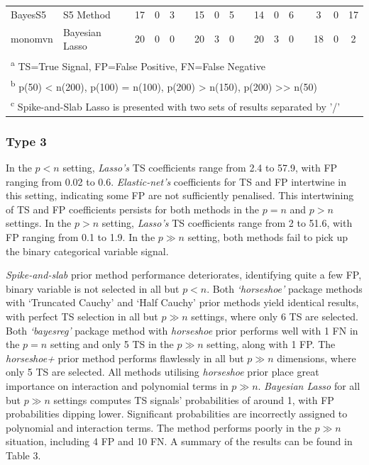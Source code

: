 \documentclass[
  11pt,
]{article}
\begin{document}
\begin{landscape}
\begin{table}[H]
\begin{tabular}[t]{>{}l|>{}l|>{}c|>{}c|>{}c|>{}c|>{}c|>{}c|>{}c|>{}c|>{}c|>{}c|>{}c|>{}c|>{}c|>{}c|>{}c|}
\hspace{1em}BayesS5 & S5 Method & 17 & 0 & 3 &  & 15 & 0 & 5 &  & 14 & 0 & 6 &  & 3 & 0 & 17\\
\hspace{1em}monomvn & Bayesian Lasso & 20 & 0 & 0 &  & 20 & 3 & 0 &  & 20 & 3 & 0 &  & 18 & 0 & 2\\
\bottomrule
\multicolumn{17}{l}{\textsuperscript{a} TS=True Signal, FP=False Positive, FN=False Negative}\\
\multicolumn{17}{l}{\textsuperscript{b} p(50) < n(200), p(100) = n(100), p(200) > n(150), p(200) >> n(50)}\\
\multicolumn{17}{l}{\textsuperscript{c} Spike-and-Slab Lasso is presented with two sets of results separated by '/'}\\
\end{tabular}
\end{table}
  
\end{landscape}

\subsubsection{Type 3}

In the \(p<n\) setting, \emph{Lasso's} TS coefficients range from 2.4 to
57.9, with FP ranging from 0.02 to 0.6. \emph{Elastic-net's}
coefficients for TS and FP intertwine in this setting, indicating some
FP are not sufficiently penalised. This intertwining of TS and FP
coefficients persists for both methods in the \(p=n\) and \(p>n\)
settings. In the \(p>n\) setting, \emph{Lasso's} TS coefficients range
from 2 to 51.6, with FP ranging from 0.1 to 1.9. In the \(p \gg n\)
setting, both methods fail to pick up the binary categorical variable
signal.

\emph{Spike-and-slab} prior method performance deteriorates, identifying
quite a few FP, binary variable is not selected in all but \(p<n\). Both
\emph{`horseshoe'} package methods with `Truncated Cauchy' and `Half
Cauchy' prior methods yield identical results, with perfect TS selection
in all but \(p \gg n\) settings, where only 6 TS are selected. Both
\emph{`bayesreg'} package method with \emph{horseshoe} prior performs
well with 1 FN in the \(p=n\) setting and only 5 TS in the \(p \gg n\)
setting, along with 1 FP. The \emph{horseshoe+} prior method performs
flawlessly in all but \(p \gg n\) dimensions, where only 5 TS are
selected. All methods utilising \emph{horseshoe} prior place great
importance on interaction and polynomial terms in \(p \gg n\).
\emph{Bayesian Lasso} for all but \(p \gg n\) settings computes TS
signals' probabilities of around 1, with FP probabilities dipping lower.
Significant probabilities are incorrectly assigned to polynomial and
interaction terms. The method performs poorly in the \(p \gg n\)
situation, including 4 FP and 10 FN. A summary of the results can be
found in Table 3.
\end{document}
